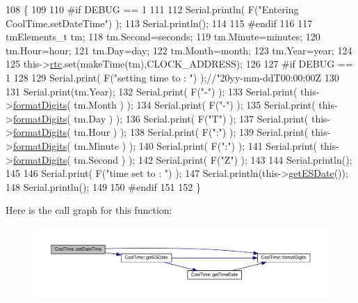 \begin{DoxyCode}
108 \{ 
109 
110 \textcolor{preprocessor}{#if DEBUG == 1}
111 
112     Serial.println( F(\textcolor{stringliteral}{"Entering CoolTime.setDateTime"}) );
113     Serial.println();
114 
115 \textcolor{preprocessor}{#endif}
116 
117     tmElements\_t tm;
118     tm.Second=seconds; 
119     tm.Minute=minutes; 
120     tm.Hour=hour; 
121     tm.Day=day;
122     tm.Month=month; 
123     tm.Year=year;
124     
125     this->\hyperlink{class_cool_time_abd38f2384ff90692b1568d9db869412e}{rtc}.set(makeTime(tm),CLOCK\_ADDRESS);   
126 
127 \textcolor{preprocessor}{#if DEBUG == 1}
128 
129     Serial.print( F(\textcolor{stringliteral}{"setting time to : "}) );\textcolor{comment}{//"20yy-mm-ddT00:00:00Z}
130 
131     Serial.print(tm.Year);
132     Serial.print( F(\textcolor{stringliteral}{"-"}) );
133     Serial.print( this->\hyperlink{class_cool_time_acd537cd4210d7bde4e1f5c47d2ac0456}{formatDigits}( tm.Month ) );
134     Serial.print( F(\textcolor{stringliteral}{"-"}) );
135     Serial.print( this->\hyperlink{class_cool_time_acd537cd4210d7bde4e1f5c47d2ac0456}{formatDigits}( tm.Day ) );
136     Serial.print( F(\textcolor{stringliteral}{"T"}) );
137     Serial.print( this->\hyperlink{class_cool_time_acd537cd4210d7bde4e1f5c47d2ac0456}{formatDigits}( tm.Hour ) );
138     Serial.print( F(\textcolor{stringliteral}{":"}) );
139     Serial.print( this->\hyperlink{class_cool_time_acd537cd4210d7bde4e1f5c47d2ac0456}{formatDigits}( tm.Minute ) );
140     Serial.print( F(\textcolor{stringliteral}{":"}) );
141     Serial.print( this->\hyperlink{class_cool_time_acd537cd4210d7bde4e1f5c47d2ac0456}{formatDigits}( tm.Second ) );
142     Serial.print( F(\textcolor{stringliteral}{"Z"}) );
143 
144     Serial.println();
145     
146     Serial.print( F(\textcolor{stringliteral}{"time set to : "}) );
147     Serial.println(this->\hyperlink{class_cool_time_ac4f32ee513c1328d984306645e8785a4}{getESDate}());
148     Serial.println();
149 
150 \textcolor{preprocessor}{#endif}
151 
152 \}
\end{DoxyCode}
Here is the call graph for this function\+:\nopagebreak
\begin{figure}[H]
\begin{center}
\leavevmode
\includegraphics[width=350pt]{d6/d49/class_cool_time_ab81ea7fdaace111aa01cc1ec84c6d297_cgraph}
\end{center}
\end{figure}
\mbox{\label{class_cool_time_aae601f795452cfa48d9fb337aed483a8}} 
